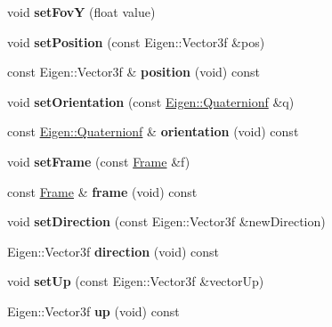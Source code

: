 \begin{DoxyCompactItemize}
void {\bfseries set\+FovY} (float value)
\item 
\mbox{\label{class_camera_a96515ee1c016f5e94a80c4808a6111b1}} 
void {\bfseries set\+Position} (const Eigen\+::\+Vector3f \&pos)
\item 
\mbox{\label{class_camera_ac5e39b63430bbcdc52d42e7c69374efe}} 
const Eigen\+::\+Vector3f \& {\bfseries position} (void) const
\item 
\mbox{\label{class_camera_abcdafc0aeba359632ecef5bf07bbfa4c}} 
void {\bfseries set\+Orientation} (const \hyperlink{group___geometry___module_ga785b13a5a87f9bf55d4eba51ead2dcf0}{Eigen\+::\+Quaternionf} \&q)
\item 
\mbox{\label{class_camera_a87dcab091782b992386fc0fa30d77f46}} 
const \hyperlink{group___geometry___module_ga785b13a5a87f9bf55d4eba51ead2dcf0}{Eigen\+::\+Quaternionf} \& {\bfseries orientation} (void) const
\item 
\mbox{\label{class_camera_a4530ee56805bc5cdd73f2f9bb6cf7a60}} 
void {\bfseries set\+Frame} (const \hyperlink{class_frame}{Frame} \&f)
\item 
\mbox{\label{class_camera_ab03a6fbb5d510bdf99da94654115c773}} 
const \hyperlink{class_frame}{Frame} \& {\bfseries frame} (void) const
\item 
\mbox{\label{class_camera_af8621940fefd60a60df8a02093458960}} 
void {\bfseries set\+Direction} (const Eigen\+::\+Vector3f \&new\+Direction)
\item 
\mbox{\label{class_camera_ace5c2c254f904f1fad7710d318f3f72b}} 
Eigen\+::\+Vector3f {\bfseries direction} (void) const
\item 
\mbox{\label{class_camera_a37d3cc83aae74054afd31be57eee5f15}} 
void {\bfseries set\+Up} (const Eigen\+::\+Vector3f \&vector\+Up)
\item 
\mbox{\label{class_camera_a5f6c90f1cc7905dea02d6fc7ebc1711c}} 
Eigen\+::\+Vector3f {\bfseries up} (void) const
\item 
\mbox{\label{class_camera_adbc28b4b6d57578a6d8f478bf1110e8f}} 

\end{DoxyCompactItemize}
